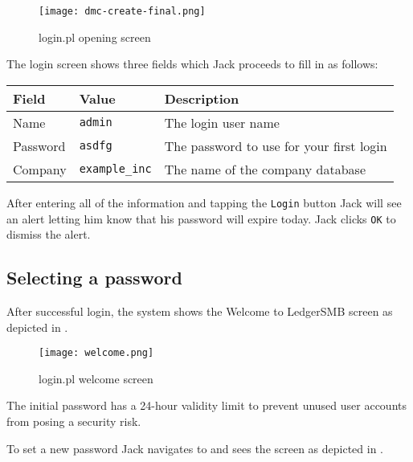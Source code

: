 \begin{figure}[h]
\centering
\texttt{[image: dmc-create-final.png]}
\caption{login.pl opening screen}
\label{fig:login-screen}
\end{figure}

The login screen shows three fields which Jack proceeds to fill in as follows:

\begin{longtable}{ llp{6cm} }
	Field & Value & Description \\ \hline
	\endhead
	Name & \texttt{admin} & The login user name\\
	Password & \texttt{asdfg} & The password to use for your first login\\
	Company & \texttt{example\_inc} & The name of the company database \\
\end{longtable}


After entering all of the information and tapping the \texttt{Login} button Jack will see an alert letting
him know that his password will expire today.  Jack clicks \texttt{OK} to dismiss the alert.

\subsection{Selecting a password}
\label{subsec-first-login-password}

After successful login, the system shows the Welcome to LedgerSMB  screen as depicted in
.

\begin{figure}[h]
	\centering
	\texttt{[image: welcome.png]}
	\caption{login.pl welcome screen}
	\label{fig:login-welcome-screen}
\end{figure}

The
initial password has a 24-hour validity limit to prevent unused user accounts from posing
a security risk.  

To set a new password Jack navigates to  and sees the 
screen as depicted in .

